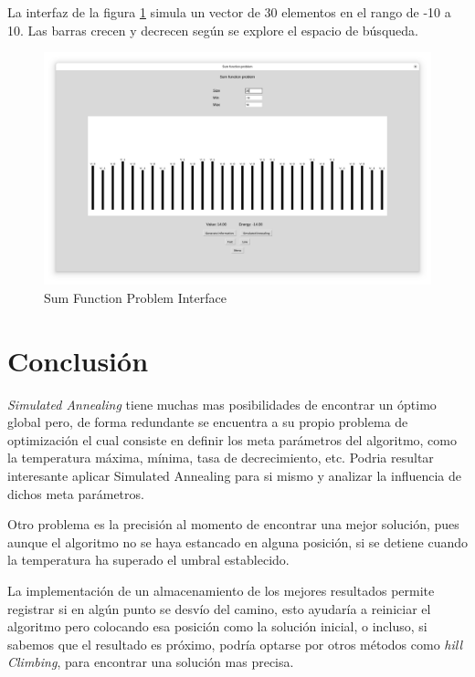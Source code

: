 \documentclass[12pt,twoside]{article}
\begin{document}
La interfaz de la figura \ref{fig:sfp} simula un vector de 30 elementos en el rango de -10 a 10. Las barras crecen y decrecen según se explore el espacio de búsqueda. 

\begin{figure}[h!]
	\centering
	\includegraphics[width=\linewidth]{img/sfp}
	\caption{Sum Function Problem Interface}
	\label{fig:sfp}
\end{figure}

\clearpage
\section{Conclusión}

\textit{Simulated Annealing} tiene muchas mas posibilidades de encontrar un óptimo global pero, de forma redundante se encuentra a su propio problema de optimización el cual consiste en definir los meta parámetros del algoritmo, como la temperatura máxima, mínima, tasa de decrecimiento, etc. Podria resultar interesante aplicar Simulated Annealing para si mismo y analizar la influencia de dichos meta parámetros.

Otro problema es la precisión al momento de encontrar una mejor solución, pues aunque el algoritmo no se haya estancado en alguna posición, si se detiene cuando la temperatura ha superado el umbral establecido.

La implementación de un almacenamiento de los mejores resultados permite registrar si en algún punto se desvío del camino, esto ayudaría a reiniciar el algoritmo pero colocando esa posición como la solución inicial, o incluso, si sabemos que el resultado es próximo, podría optarse por otros métodos como \textit{hill Climbing}, para encontrar una solución mas precisa.


	\clearpage
	
	
\end{document}

